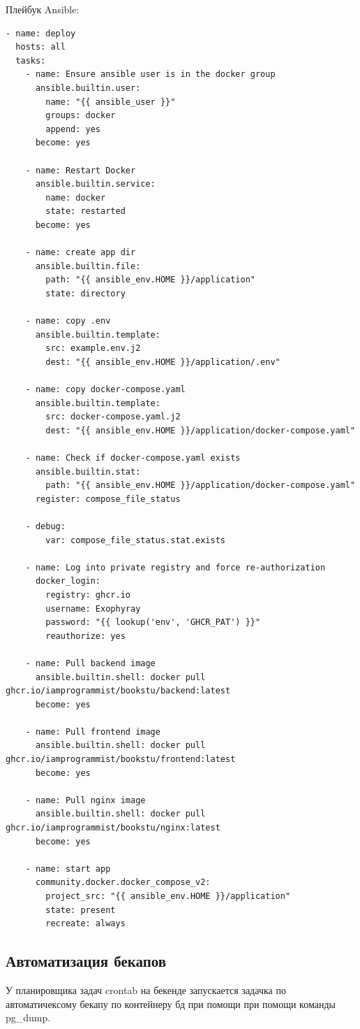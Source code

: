 \documentclass[a4paper,14pt]{extarticle}
\begin{document}
Плейбук Ansible:
\begin{verbatim}
- name: deploy
  hosts: all
  tasks:
    - name: Ensure ansible user is in the docker group
      ansible.builtin.user:
        name: "{{ ansible_user }}"
        groups: docker
        append: yes
      become: yes

    - name: Restart Docker
      ansible.builtin.service:
        name: docker
        state: restarted
      become: yes

    - name: create app dir
      ansible.builtin.file:
        path: "{{ ansible_env.HOME }}/application"
        state: directory

    - name: copy .env
      ansible.builtin.template:
        src: example.env.j2
        dest: "{{ ansible_env.HOME }}/application/.env"

    - name: copy docker-compose.yaml
      ansible.builtin.template:
        src: docker-compose.yaml.j2
        dest: "{{ ansible_env.HOME }}/application/docker-compose.yaml"

    - name: Check if docker-compose.yaml exists
      ansible.builtin.stat:
        path: "{{ ansible_env.HOME }}/application/docker-compose.yaml"
      register: compose_file_status

    - debug:
        var: compose_file_status.stat.exists
    
    - name: Log into private registry and force re-authorization
      docker_login:
        registry: ghcr.io
        username: Exophyray
        password: "{{ lookup('env', 'GHCR_PAT') }}"
        reauthorize: yes
    
    - name: Pull backend image
      ansible.builtin.shell: docker pull ghcr.io/iamprogrammist/bookstu/backend:latest
      become: yes

    - name: Pull frontend image
      ansible.builtin.shell: docker pull ghcr.io/iamprogrammist/bookstu/frontend:latest
      become: yes

    - name: Pull nginx image
      ansible.builtin.shell: docker pull ghcr.io/iamprogrammist/bookstu/nginx:latest
      become: yes

    - name: start app
      community.docker.docker_compose_v2:
        project_src: "{{ ansible_env.HOME }}/application"
        state: present
        recreate: always
\end{verbatim}

\subsection{Автоматизация бекапов}
У планировщика задач crontab на бекенде запускается задачка по автоматичексому бекапу
по контейнеру бд при помощи при помощи команды pg\_dump. 
\end{document}
